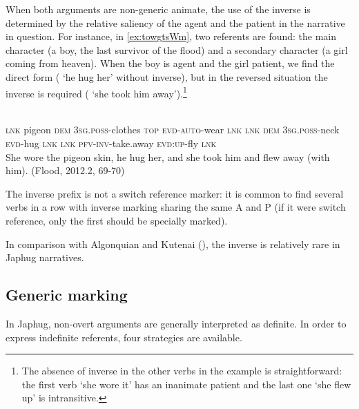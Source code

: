  
When both arguments are non-generic animate, the use of the inverse is determined by the relative saliency of the agent and the patient in the narrative in question. For instance, in \ref{ex:towgtsWm}, two referents are found: the main character (a boy, the last survivor of the flood) and a secondary character (a girl coming from heaven). When the boy is agent and the girl patient, we find the direct form (  `he hug her' without inverse), but in the reversed situation the inverse is required ( `she took him away').\footnote{The absence of inverse in the other verbs in the example is straightforward: the first verb 	  `she wore it' has an inanimate patient and the last one   `she flew up' is intransitive. }

 \begin{exe}
\ex \label{ex:towgtsWm} 
\gll
{} 	 	 	 	 	 	   	 	 	 	  	 	 	 \\
\textsc{lnk} pigeon \textsc{dem} \textsc{3sg.poss}-clothes \textsc{top} \textsc{evd-auto}-wear \textsc{lnk} \textsc{lnk} \textsc{dem} \textsc{3sg.poss}-neck \textsc{evd}-hug \textsc{lnk} \textsc{lnk} \textsc{pfv-inv}-take.away \textsc{evd:up}-fly \textsc{lnk} \\
\glt She wore the pigeon skin, he hug her, and she took him and flew away (with him). (Flood, 2012.2, 69-70)
\end{exe}

The inverse prefix  is not a switch reference marker: it is common to find several verbs in a row with inverse marking sharing the same A and P (if it were switch reference, only the first should be specially marked).

In comparison with Algonquian and Kutenai (\citealt{dryer94inverse}), the inverse is relatively rare in Japhug narratives.

\subsection{Generic marking}  \label{sec:genr.jpg}

In Japhug, non-overt arguments are generally interpreted as definite. In order to express indefinite referents, four strategies are available. 

